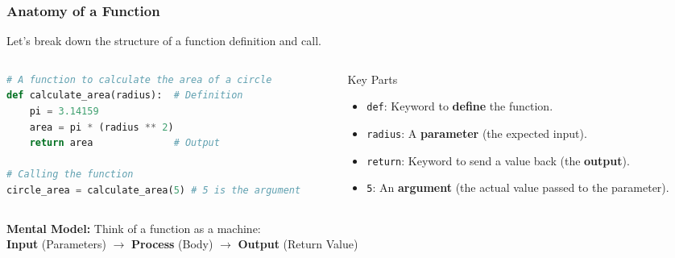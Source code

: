 \documentclass{beamer}
\begin{document}
\begin{frame}[fragile]
    \frametitle{Anatomy of a Function}
    
    Let's break down the structure of a function definition and call.
    
    \begin{columns}[T]
        \begin{column}{0.6\textwidth}
            \begin{lstlisting}[language=Python]
# A function to calculate the area of a circle
def calculate_area(radius):  # Definition
    pi = 3.14159
    area = pi * (radius ** 2)
    return area              # Output

# Calling the function
circle_area = calculate_area(5) # 5 is the argument
            \end{lstlisting}
        \end{column}
        \begin{column}{0.4\textwidth}
            \begin{block}{Key Parts}
                \begin{itemize}
                    \item \texttt{def}: Keyword to \textbf{define} the function.
                    \item \texttt{radius}: A \textbf{parameter} (the expected input).
                    \item \texttt{return}: Keyword to send a value back (the \textbf{output}).
                    \item \texttt{5}: An \textbf{argument} (the actual value passed to the parameter).
                \end{itemize}
            \end{block}
        \end{column}
    \end{columns}

    \vspace{1em}
    \textbf{Mental Model:} Think of a function as a machine: \\
    \textbf{Input} (Parameters) $\rightarrow$ \textbf{Process} (Body) $\rightarrow$ \textbf{Output} (Return Value)
    
\end{frame}
\end{document}
